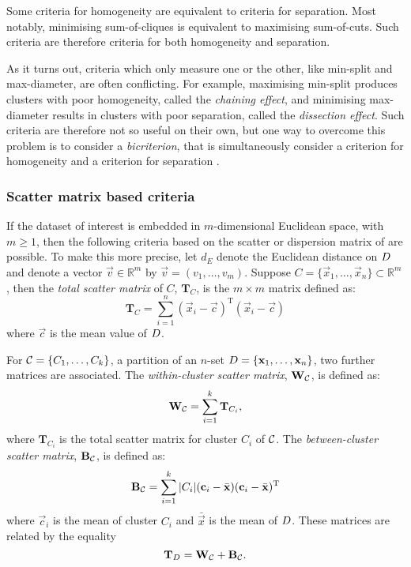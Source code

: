 Some criteria for homogeneity are equivalent to criteria for separation.  Most
notably, minimising sum-of-cliques is equivalent to maximising sum-of-cuts.
Such criteria are therefore criteria for both homogeneity and separation.

As it turns out, criteria which only measure one or the other, like min-split
and max-diameter, are often conflicting.  For example, maximising min-split
produces clusters with poor homogeneity, called the \textit{chaining effect},
and minimising max-diameter results in clusters with poor separation, called
the \textit{dissection effect}.  Such criteria are therefore not so useful on
their own, but one way to overcome this problem is to consider a
\textit{bicriterion}, that is simultaneously consider a criterion for
homogeneity and a criterion for separation \citep{delattre1980bicriterion}.

\subsubsection{Scatter matrix based criteria}
\label{sec:scatter-matrix-based}

If the dataset of interest is embedded in $m$-dimensional Euclidean space,
with $m \geq 1$, then the following criteria based on the scatter or
dispersion matrix of \citet{wilks60} are possible.  To make this more precise,
let $d_E$ denote the Euclidean distance on $D$ and denote a vector
$\vec{v} \in \mathbb{R}^m$ by $\vec{v} = (v_1,\dotsc,v_m)$.  Suppose $C =
\{\vec{x}_1,\dotsc,\vec{x}_n\} \subset \mathbb{R}^m$, then the \textit{total
  scatter matrix} of $C$, $\mathbf{T}_{C}$, is the $m \times m$ matrix defined
as:
\begin{equation*}
  \mathbf{T}_{C} = \sum_{i=1}^{n} (\vec{x}_i - \vec{c})^{\mathrm{T}}(\vec{x}_i - \vec{c})
\end{equation*}
where $\vec{c}$ is the mean value of $D$.

For $\mathcal{C} = \{C_1,\dotsc,C_k\}$, a partition of an $n$-set $D =
\{\mathbf{x}_1,\dotsc,\mathbf{x}_n\}$, two further matrices are associated.  The
\textit{within-cluster scatter matrix}, $\mathbf{W}_{\mathcal{C}}$, is defined as:
\begin{equation*}
\mathbf{W}_{\mathcal{C}} = \sum_{i=1}^{k} \mathbf{T}_{C_i},
\end{equation*}
where $\mathbf{T}_{C_i}$ is the total scatter matrix for cluster $C_i$ of
$\mathcal{C}$.  The \textit{between-cluster scatter matrix}, $\mathbf{B}_{\mathcal{C}}$,
is defined as:
\begin{equation*}
  \mathbf{B}_{\mathcal{C}} =
  \sum_{i=1}^{k} |C_i| (\mathbf{c}_i - \bar{\mathbf{x}}) (\mathbf{c}_i -
  \bar{\mathbf{x}})^{\mathrm{T}}
\end{equation*}
where $\vec{c}_i$ is the mean of cluster $C_i$ and $\bar{\vec{x}}$ is the mean
of $D$.  These matrices are related by the equality
\begin{equation*}
  \mathbf{T}_{D} = \mathbf{W}_{\mathcal{C}} + \mathbf{B}_{\mathcal{C}}.
\end{equation*}

